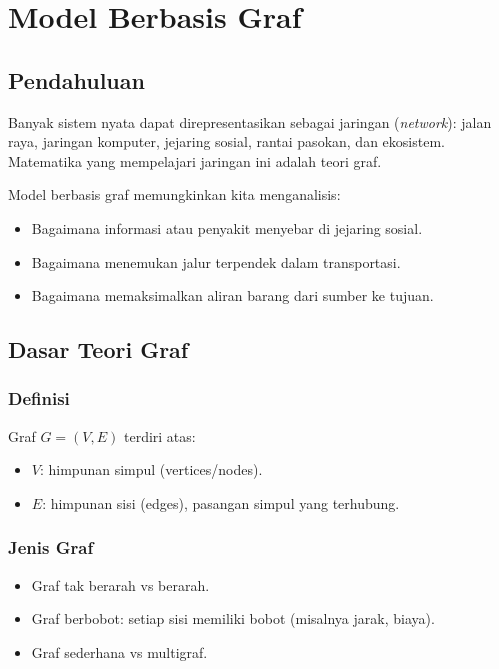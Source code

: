 \documentclass{bukumjh}
\begin{document}
\chapter{Model Berbasis Graf}

\section{Pendahuluan}
Banyak sistem nyata dapat direpresentasikan sebagai jaringan (\textit{network}): jalan raya, jaringan komputer, jejaring sosial, rantai pasokan, dan ekosistem. Matematika yang mempelajari jaringan ini adalah {\jsg teori graf}. 

Model berbasis graf memungkinkan kita menganalisis:
\begin{itemize}
    \item Bagaimana informasi atau penyakit menyebar di jejaring sosial.
    \item Bagaimana menemukan jalur terpendek dalam transportasi.
    \item Bagaimana memaksimalkan aliran barang dari sumber ke tujuan.
\end{itemize}

\section{Dasar Teori Graf}
\subsection{Definisi}
Graf $G = (V,E)$ terdiri atas:
\begin{itemize}
    \item $V$: himpunan simpul (vertices/nodes).
    \item $E$: himpunan sisi (edges), pasangan simpul yang terhubung.
\end{itemize}

\subsection{Jenis Graf}
\begin{itemize}
    \item Graf tak berarah vs berarah.
    \item Graf berbobot: setiap sisi memiliki bobot (misalnya jarak, biaya).
    \item Graf sederhana vs multigraf.
\end{itemize}
\end{document}
